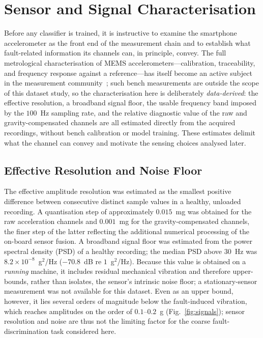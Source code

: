 
\section{Sensor and Signal Characterisation}
\label{sec:charact}

Before any classifier is trained, it is instructive to examine the smartphone
accelerometer as the front end of the measurement chain and to establish what
fault-related information its channels can, in principle, convey. The full
metrological characterisation of MEMS accelerometers---calibration, traceability,
and frequency response against a reference---has itself become an active subject
in the measurement community~\cite{prato2021mems, schiavi2023mems, demilia2021mems};
such bench measurements are outside the scope of this dataset study, so the
characterisation here is deliberately \emph{data-derived}: the effective
resolution, a broadband signal floor, the usable frequency band imposed by the
$100$~Hz sampling rate, and the relative diagnostic value of the raw and
gravity-compensated channels are all estimated directly from the acquired
recordings, without bench calibration or model training. These estimates delimit
what the channel can convey and motivate the sensing choices analysed later.

\subsection{Effective Resolution and Noise Floor}
The effective amplitude resolution was estimated as the smallest positive
difference between consecutive distinct sample values in a healthy, unloaded
recording. A quantisation step of approximately $0.015$~mg was obtained for the
raw acceleration channels and $0.001$~mg for the gravity-compensated channels,
the finer step of the latter reflecting the additional numerical processing of
the on-board sensor fusion. A broadband signal floor was estimated from the
power spectral density (PSD) of a healthy recording; the median PSD above
$30$~Hz was $8.2\times10^{-8}$~g$^2$/Hz ($-70.8$~dB re $1$~g$^2$/Hz). Because this
value is obtained on a \emph{running} machine, it includes residual mechanical
vibration and therefore upper-bounds, rather than isolates, the sensor's
intrinsic noise floor; a stationary-sensor measurement was not available for this
dataset. Even as an upper bound, however, it lies several orders of magnitude
below the fault-induced vibration, which reaches amplitudes on the order of
$0.1$--$0.2$~g (Fig.~\ref{fig:signals}); sensor resolution and noise are thus not
the limiting factor for the coarse fault-discrimination task considered here.

